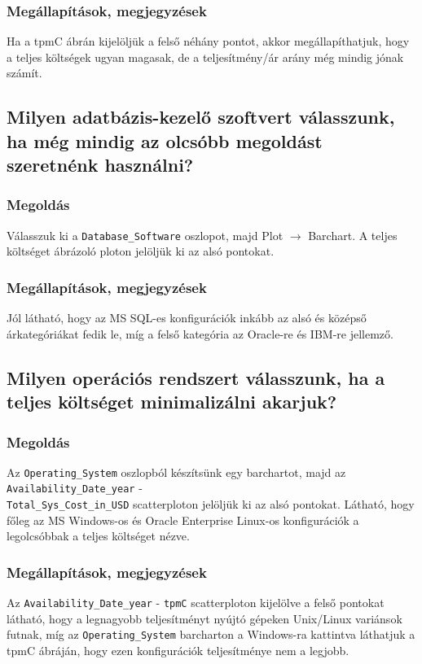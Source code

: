 \documentclass[a4paper,10pt,titlepage]{article}
\begin{document}
\subsubsection*{Megállapítások, megjegyzések}
Ha a tpmC ábrán kijelöljük a felső néhány pontot, akkor megállapíthatjuk, hogy a teljes költségek ugyan magasak, de a teljesítmény/ár arány még mindig jónak számít.

\subsection{Milyen adatbázis-kezelő szoftvert válasszunk, ha még mindig az olcsóbb megoldást szeretnénk használni?}
\subsubsection*{Megoldás}
Válasszuk ki a \texttt{Database\_Software} oszlopot, majd Plot $\rightarrow$ Barchart. A teljes költséget ábrázoló ploton jelöljük ki az alsó pontokat.
\subsubsection*{Megállapítások, megjegyzések}
Jól látható, hogy az MS SQL-es konfigurációk inkább az alsó és középső árkategóriákat fedik le, míg a felső kategória az Oracle-re és IBM-re jellemző.

\subsection{Milyen operációs rendszert válasszunk, ha a teljes költséget minimalizálni akarjuk?}
\subsubsection*{Megoldás}
Az \texttt{Operating\_System} oszlopból készítsünk egy barchartot, majd az \texttt{Availability\_Date\_year} - \\ \texttt{Total\_Sys\_Cost\_in\_USD} scatterploton jelöljük ki az alsó pontokat. Látható, hogy főleg az MS Windows-os és Oracle Enterprise Linux-os konfigurációk a legolcsóbbak a teljes költséget nézve.
\subsubsection*{Megállapítások, megjegyzések}
Az \texttt{Availability\_Date\_year} - \texttt{tpmC} scatterploton kijelölve a felső pontokat látható, hogy a legnagyobb teljesítményt nyújtó gépeken Unix/Linux variánsok futnak, míg az \texttt{Operating\_System} barcharton a Windows-ra kattintva láthatjuk a tpmC ábráján, hogy ezen konfigurációk teljesítménye nem a legjobb.
\end{document}
